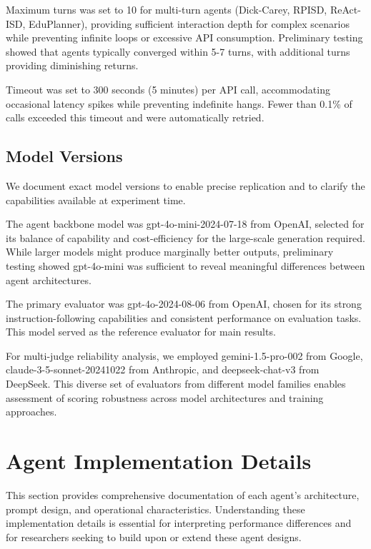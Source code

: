 Maximum turns was set to 10 for multi-turn agents (Dick-Carey, RPISD, ReAct-ISD, EduPlanner), providing sufficient interaction depth for complex scenarios while preventing infinite loops or excessive API consumption. Preliminary testing showed that agents typically converged within 5-7 turns, with additional turns providing diminishing returns.

Timeout was set to 300 seconds (5 minutes) per API call, accommodating occasional latency spikes while preventing indefinite hangs. Fewer than 0.1\% of calls exceeded this timeout and were automatically retried.

\subsection{Model Versions}

We document exact model versions to enable precise replication and to clarify the capabilities available at experiment time.

The agent backbone model was gpt-4o-mini-2024-07-18 from OpenAI, selected for its balance of capability and cost-efficiency for the large-scale generation required. While larger models might produce marginally better outputs, preliminary testing showed gpt-4o-mini was sufficient to reveal meaningful differences between agent architectures.

The primary evaluator was gpt-4o-2024-08-06 from OpenAI, chosen for its strong instruction-following capabilities and consistent performance on evaluation tasks. This model served as the reference evaluator for main results.

For multi-judge reliability analysis, we employed gemini-1.5-pro-002 from Google, claude-3-5-sonnet-20241022 from Anthropic, and deepseek-chat-v3 from DeepSeek. This diverse set of evaluators from different model families enables assessment of scoring robustness across model architectures and training approaches.

\section{Agent Implementation Details}
\label{app:agents}

This section provides comprehensive documentation of each agent's architecture, prompt design, and operational characteristics. Understanding these implementation details is essential for interpreting performance differences and for researchers seeking to build upon or extend these agent designs.

